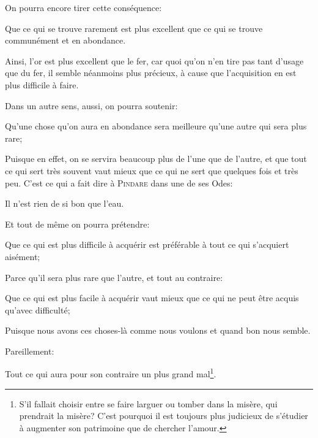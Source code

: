 \bigbreak

On pourra encore tirer cette conséquence:

\begin{lieu}
	Que ce qui se trouve rarement est plus excellent que ce qui se trouve communément et en abondance.
\end{lieu}

Ainsi, l'or est plus excellent que le fer, car quoi qu'on n'en tire pas tant d'usage que du fer, il semble néanmoins plus
précieux, à cause que l'acquisition en est plus difficile à faire.

Dans un autre sens, aussi, on pourra soutenir:

\begin{lieu}
	Qu'une chose qu'on aura en abondance sera meilleure qu'une autre qui sera plus rare;
\end{lieu}

Puisque en effet, on se servira beaucoup plus de l'une que de l'autre, et que tout ce qui sert très souvent vaut mieux que
ce qui ne sert que quelques fois et très peu. C'est ce qui a fait dire à \textsc{Pindare} dans une de ses Odes:

\begin{emphpar}
	Il n'est rien de si bon que l'eau.
\end{emphpar}

\bigbreak

Et tout de même on pourra prétendre:

\begin{lieu}
	Que ce qui est plus difficile à acquérir est préférable à tout ce qui s'acquiert aisément;
\end{lieu}

Parce qu'il sera plus rare que l'autre, et tout au contraire:

\begin{lieu}
	Que ce qui est plus facile à acquérir vaut mieux que ce qui ne peut être acquis qu'avec difficulté;
\end{lieu}

Puisque nous avons ces choses-là comme nous voulons et quand bon nous semble.

\bigbreak

Pareillement:

\begin{lieu}
	Tout ce qui aura pour son contraire un plus grand mal\footnote{S'il fallait choisir entre se faire larguer
	ou tomber dans la misère, qui prendrait la misère? C'est pourquoi il est toujours plus judicieux de s'étudier
	à augmenter son patrimoine que de chercher l'amour.}.
\end{lieu}


